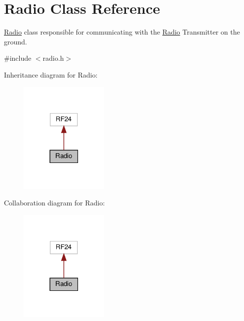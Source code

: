 \hypertarget{class_radio}{}\section{Radio Class Reference}
\label{class_radio}


\hyperlink{class_radio}{Radio} class responsible for communicating with the \hyperlink{class_radio}{Radio} Transmitter on the ground.  




{\ttfamily \#include $<$radio.\+h$>$}



Inheritance diagram for Radio\+:
\nopagebreak
\begin{figure}[H]
\begin{center}
\leavevmode
\includegraphics[width=122pt]{class_radio__inherit__graph}
\end{center}
\end{figure}


Collaboration diagram for Radio\+:
\nopagebreak
\begin{figure}[H]
\begin{center}
\leavevmode
\includegraphics[width=122pt]{class_radio__coll__graph}
\end{center}
\end{figure}
